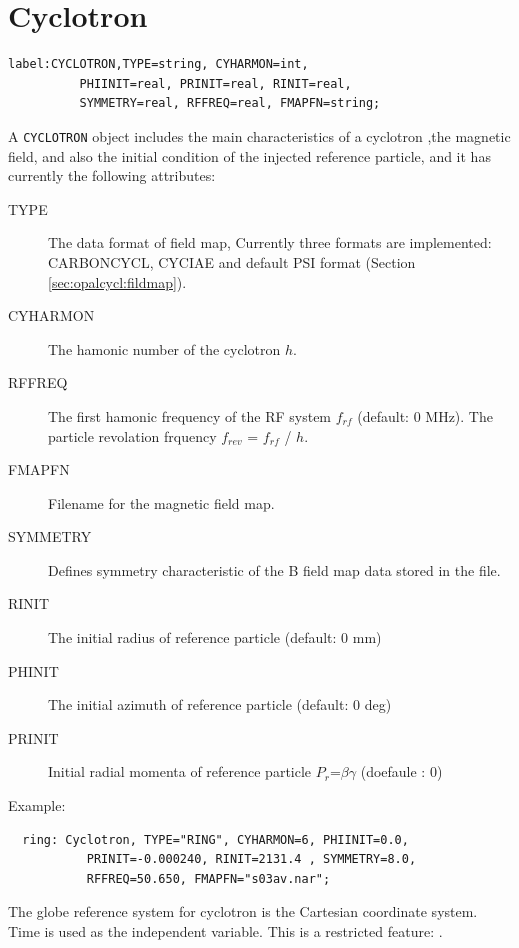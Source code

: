 \section{Cyclotron}
\label{sec:cyclotron}
\begin{verbatim}
label:CYCLOTRON,TYPE=string, CYHARMON=int, 
          PHIINIT=real, PRINIT=real, RINIT=real, 
          SYMMETRY=real, RFFREQ=real, FMAPFN=string;
\end{verbatim}
A \texttt{CYCLOTRON} object includes the main characteristics of a cyclotron ,the magnetic field, 
 and also the initial condition of the injected reference particle, and it has currently the following attributes:
\begin{description}
\item[TYPE]
   The data format of field map, Currently three formats are implemented:
   CARBONCYCL, CYCIAE and default PSI format (Section \ref{sec:opalcycl:fildmap}).
\item[CYHARMON]
  The hamonic number of the cyclotron $h$. 
\item[RFFREQ]
  The first hamonic frequency of the RF system $f_{rf}$  (default: 0 MHz).
  The particle revolation frquency $f_{rev}$ =  $f_{rf}$ / $h$.
\item[FMAPFN]
  Filename for the magnetic field map. 
\item[SYMMETRY]
  Defines symmetry characteristic of the B field map data stored in the file.  
\item[RINIT]
  The initial radius of reference particle (default: 0 mm)
\item[PHINIT]
  The initial azimuth of reference particle (default: 0 deg)
\item[PRINIT]
  Initial radial momenta of reference particle $P_r$=$\beta$$\gamma$ (doefaule : 0)
\end{description}
\noindent Example:
\begin{verbatim}
  ring: Cyclotron, TYPE="RING", CYHARMON=6, PHIINIT=0.0, 
           PRINIT=-0.000240, RINIT=2131.4 , SYMMETRY=8.0, 
           RFFREQ=50.650, FMAPFN="s03av.nar";
\end{verbatim}
The globe reference system for cyclotron is the Cartesian coordinate system.
Time is used as the  independent variable.
This is a restricted feature: \opalcycl .
